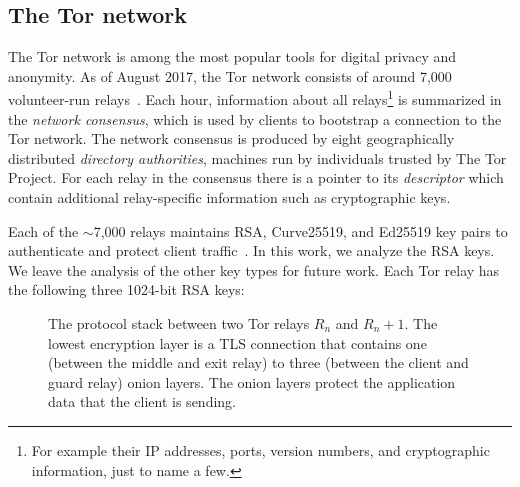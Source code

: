\subsection{The Tor network}
\label{sec:tor-network}
The Tor network is among the most popular tools for digital privacy and
anonymity. As of August 2017, the Tor network consists of around 7,000
volunteer-run relays~\cite{tormetrics}.  Each hour, information about all
relays\footnote{For example their IP addresses, ports, version numbers, and
cryptographic information, just to name a few.} is summarized in the
\emph{network consensus}, which is used by clients to bootstrap a connection to
the Tor network.  The network consensus is produced by eight geographically
distributed \emph{directory authorities}, machines run by individuals trusted by
The Tor Project.  For each relay in the consensus there is a pointer to its
\emph{descriptor} which contain additional relay-specific information such as
cryptographic keys.

Each of the $\sim$7,000 relays maintains RSA, Curve25519, and Ed25519 key pairs
to authenticate and protect client traffic~\cite[\S~1.1]{torspec}. In this work,
we analyze the RSA keys.  We leave the analysis of the other key types for
future work.  Each Tor relay has the following three 1024-bit RSA keys:

\begin{figure}
\centering
\tikzset{>=latex}
\caption{The protocol stack between two Tor relays $R_n$ and $R_n+1$.  The
	lowest encryption layer is a TLS connection that contains one (between the
	middle and exit relay) to three (between the client and guard relay) onion
	layers.  The onion layers protect the application data that the client is
	sending.} \label{fig:protostack}
\end{figure}


